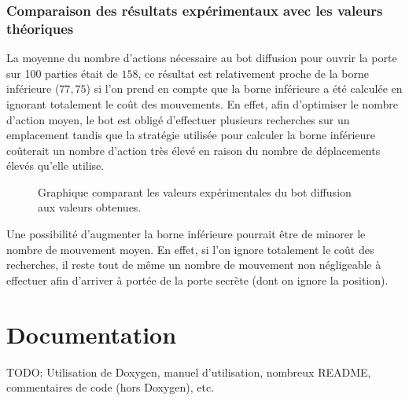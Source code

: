 \documentclass[a4paper,12pt]{article}
\begin{document}
\subsubsection{Comparaison des résultats expérimentaux avec les valeurs
  théoriques}
La moyenne du nombre d'actions nécessaire au bot diffusion pour ouvrir la porte
sur 100 parties était de $158$, ce résultat est relativement proche de la borne
inférieure ($77,75$) si l'on prend en compte que la borne inférieure a été
calculée en ignorant totalement le coût des mouvements. En effet, afin
d'optimiser le nombre d'action moyen, le bot est obligé d'effectuer plusieurs
recherches sur un emplacement tandis que la stratégie utilisée pour calculer la
borne inférieure coûterait un nombre d'action très élevé en raison du nombre de
déplacements élevés qu'elle utilise.
\begin{figure}[H]
	\caption{\label{fig:compare} Graphique comparant les valeurs expérimentales du
  bot diffusion aux valeurs obtenues.}
\end{figure}

Une possibilité d'augmenter la borne inférieure pourrait être de minorer le
nombre de mouvement moyen. En effet, si l'on ignore totalement le coût des
recherches, il reste tout de même un nombre de mouvement non négligeable à
effectuer afin d'arriver à portée de la porte secrète (dont on ignore la
position).

\section{Documentation}
TODO: Utilisation de Doxygen, manuel d'utilisation, nombreux README, commentaires de
code (hors Doxygen), etc.
\end{document}
